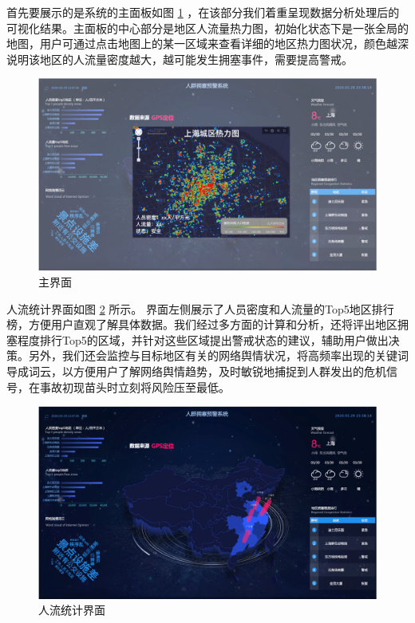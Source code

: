 \documentclass{ctexrep}
\begin{document}
首先要展示的是系统的主面板如图 \ref{fig:main} ，在该部分我们着重呈现数据分析处理后的可视化结果。主面板的中心部分是地区人流量热力图，初始化状态下是一张全局的地图，用户可通过点击地图上的某一区域来查看详细的地区热力图状况，颜色越深说明该地区的人流量密度越大，越可能发生拥塞事件，需要提高警戒。
\begin{figure}[H]
	\centering
	\includegraphics[scale=0.5]{img/proto_main.png}
	\caption{\label{fig:main}主界面}
\end{figure}

人流统计界面如图 \ref{fig:human} 所示。 界面左侧展示了人员密度和人流量的Top5地区排行榜，方便用户直观了解具体数据。我们经过多方面的计算和分析，还将评出地区拥塞程度排行Top5的区域，并针对这些区域提出警戒状态的建议，辅助用户做出决策。另外，我们还会监控与目标地区有关的网络舆情状况，将高频率出现的关键词导成词云，以方便用户了解网络舆情趋势，及时敏锐地捕捉到人群发出的危机信号，在事故初现苗头时立刻将风险压至最低。
\begin{figure}[H]
	\centering
	\includegraphics[scale=0.5]{img/proto_human.png}
	\caption{\label{fig:human}人流统计界面}
\end{figure}
\end{document}
